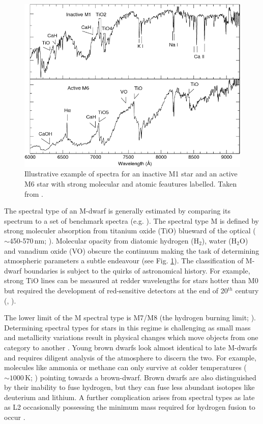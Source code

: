 \begin{figure}
    \centering
    \includegraphics[scale=0.5]{3-images/M_dwarf_spectra.png}
    \caption{Illustrative example of spectra for an inactive M1 star and an active M6 star with strong molecular and atomic feautures labelled. Taken from \protect\citet{2007AJ....133..531B}.}
    \label{fig:M6_spectra}
\end{figure}

The spectral type of an M-dwarf is generally estimated by comparing its spectrum to a set of benchmark spectra (e.g. \citealt{2007AJ....134.2398C}). The spectral type M is defined by strong moleculer absorption from titanium oxide (TiO) blueward of the optical ($\sim$450-570\,nm; \citealt{morgan}). Molecular opacity from diatomic hydrogen (H$_2$), water (H$_2$O) and vanadium oxide (VO) obscure the continuum making the task of determining atmospheric parameters a subtle endeavour (see Fig. \ref{fig:M6_spectra}). The classification of M-dwarf boundaries is subject to the quirks of astronomical history. For example, strong TiO lines can be measured at redder wavelengths for stars hotter than M0 but required the development of red-sensitive detectors at the end of 20$^{th}$ century (\citealt{1991ApJS...77..417K}, \citealt{1991AJ....101..662B}). 

The lower limit of the M spectral type is M7/M8 (the hydrogen burning limit; \citealt{1998A&A...337..403B}). Determining spectral types for stars in this regime is challenging as small mass and metallicity variations result in physical changes which move objects from one category to another \citep{2014AJ....147...94D}. Young brown dwarfs look almost identical to late M-dwarfs and requires diligent analysis of the atmosphere to discern the two. For example, molecules like ammonia or methane can only survive at colder temperatures ($\sim 1000$\,K; \citealt{1999A&A...349L..41C}) pointing towards a brown-dwarf. Brown dwarfs are also distinguished by their inability to fuse hydrogen, but they can fuse less abundant isotopes like deuterium and lithium. A further complication arises from spectral types as late as L2 occasionally possessing the minimum mass required for hydrogen fusion to occur \citep{2014AJ....147...94D}. 




